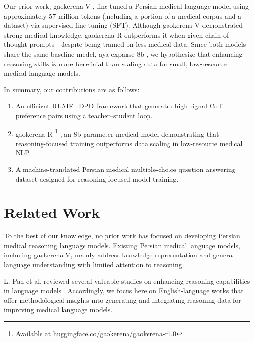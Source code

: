 \documentclass[conference]{IEEEtran}
\begin{document}
Our prior work, gaokerena-V
\cite{b7}, fine-tuned a Persian medical language model using approximately 57 million tokens (including a portion of a medical corpus and a dataset) via supervised fine-tuning (SFT).  
Although gaokerena-V demonstrated strong medical knowledge, gaokerena-R outperforms it when given chain-of-thought prompts—despite being trained on less medical data.  
Since both models share the same baseline model, aya-expanse-8b
\cite{b8}, we hypothesize that enhancing reasoning skills is more beneficial than scaling data for small, low-resource medical language models.

In summary, our contributions are as follows:

\begin{enumerate}
  \item An efficient RLAIF+DPO framework that generates high-signal CoT preference pairs using a teacher–student loop.
  \item gaokerena-R
\footnote{Available at huggingface.co/gaokerena/gaokerena-r1.0}
, an 8b-parameter medical model demonstrating that reasoning-focused training outperforms data scaling in low-resource medical NLP.
  \item A machine-translated Persian medical multiple-choice question answering dataset designed for reasoning-focused model training.
\end{enumerate}

	
	\section{Related Work}
To the best of our knowledge, no prior work has focused on developing Persian medical reasoning language models. Existing Persian medical language models, including gaokerena-V, mainly address knowledge representation and general language understanding with limited attention to reasoning.

 L. Pan et al. reviewed several valuable studies on enhancing reasoning capabilities in language models
\cite{b9}.
Accordingly, we focus here on English-language works that offer methodological insights into generating and integrating reasoning data for improving medical language models.
\end{document}
